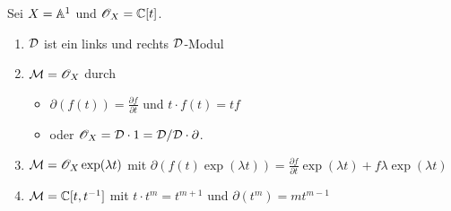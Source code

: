 \begin{exmp}
Sei $X=\mathbb{A}^1$ und $\mathscr{O}_X=\mathbb{C}[t]$.
\begin{enumerate}
\item $\mathcal{D}$ ist ein links und rechts $\mathcal{D}$-Modul
\item $\mathcal{M}=\mathscr{O}_X$ durch
\begin{itemize}
\item $\partial(f(t))=\frac{\partial f}{\partial t}$ und
$t\cdot f(t)=tf$
\item oder \cite[Exmp 3.1.2]{ginzburg} $\mathscr{O}_X=\mathcal{D}\cdot1=\mathcal{D}/\mathcal{D}\cdot\partial$.
\end{itemize}
\item $\mathcal{M}=\mathscr{O}_X\exp(\lambda t)$ mit $\partial(f(t)\exp(\lambda
t))=\frac{\partial f}{\partial t}\exp(\lambda t)+f\lambda\exp(\lambda t)$
\item $\mathcal{M}=\mathbb{C}[t,t^{-1}]$ mit $t\cdot t^{m}=t^{m+1}$ und
$\partial(t^m)=mt^{m-1}$
\end{enumerate}
\end{exmp}

